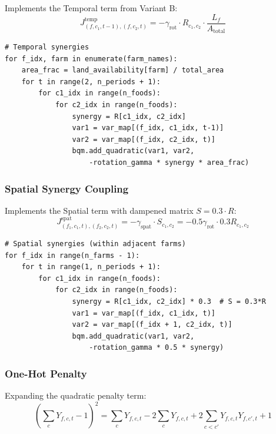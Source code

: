 \documentclass[11pt,a4paper]{article}
\begin{document}
Implements the Temporal term from Variant B:
\begin{equation}
J^{\text{temp}}_{(f,c_1,t-1),(f,c_2,t)} = -\gamma_{\text{rot}} \cdot R_{c_1,c_2} \cdot \frac{L_f}{A_{\text{total}}}
\end{equation}

\begin{lstlisting}[caption={Temporal Synergy Implementation}]
# Temporal synergies
for f_idx, farm in enumerate(farm_names):
    area_frac = land_availability[farm] / total_area
    for t in range(2, n_periods + 1):
        for c1_idx in range(n_foods):
            for c2_idx in range(n_foods):
                synergy = R[c1_idx, c2_idx]
                var1 = var_map[(f_idx, c1_idx, t-1)]
                var2 = var_map[(f_idx, c2_idx, t)]
                bqm.add_quadratic(var1, var2, 
                    -rotation_gamma * synergy * area_frac)
\end{lstlisting}

\subsubsection{Spatial Synergy Coupling}

Implements the Spatial term with dampened matrix $S = 0.3 \cdot R$:
\begin{equation}
J^{\text{spat}}_{(f_1,c_1,t),(f_2,c_2,t)} = -\gamma_{\text{spat}} \cdot S_{c_1,c_2} = -0.5\gamma_{\text{rot}} \cdot 0.3 R_{c_1,c_2}
\end{equation}

\begin{lstlisting}[caption={Spatial Synergy Implementation}]
# Spatial synergies (within adjacent farms)
for f_idx in range(n_farms - 1):
    for t in range(1, n_periods + 1):
        for c1_idx in range(n_foods):
            for c2_idx in range(n_foods):
                synergy = R[c1_idx, c2_idx] * 0.3  # S = 0.3*R
                var1 = var_map[(f_idx, c1_idx, t)]
                var2 = var_map[(f_idx + 1, c2_idx, t)]
                bqm.add_quadratic(var1, var2, 
                    -rotation_gamma * 0.5 * synergy)
\end{lstlisting}

\subsubsection{One-Hot Penalty}

Expanding the quadratic penalty term:
\begin{equation}
\left(\sum_c Y_{f,c,t} - 1\right)^2 = \sum_c Y_{f,c,t} - 2\sum_c Y_{f,c,t} + 2\sum_{c<c'} Y_{f,c,t} Y_{f,c',t} + 1
\end{equation}
\end{document}
